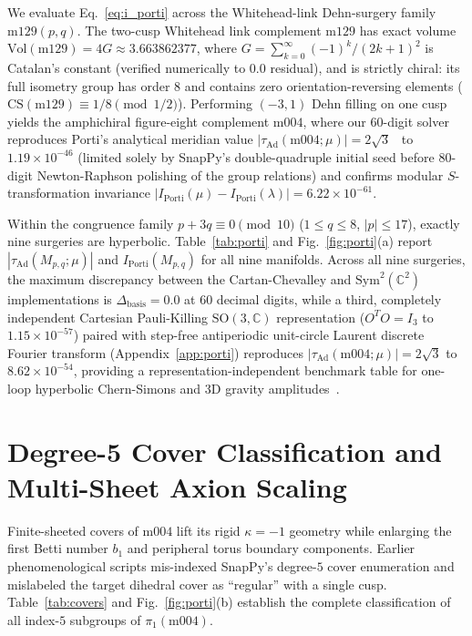 \documentclass[aps,prd,twocolumn,nofootinbib,floatfix]{revtex4-2}
\begin{document}
We evaluate Eq.~\eqref{eq:i_porti} across the Whitehead-link Dehn-surgery family $\mathrm{m129}(p,q)$.
The two-cusp Whitehead link complement $\mathrm{m129}$ has exact volume $\mathrm{Vol}(\mathrm{m129}) = 4G \approx 3.663862377$, where $G = \sum_{k=0}^\infty (-1)^k/(2k+1)^2$ is Catalan's constant (verified numerically to $0.0$ residual), and is strictly chiral: its full isometry group has order $8$ and contains zero orientation-reversing elements ($\mathrm{CS}(\mathrm{m129}) \equiv 1/8 \pmod{1/2}$).
Performing $(-3,1)$ Dehn filling on one cusp yields the amphichiral figure-eight complement $\mathrm{m004}$, where our $60$-digit solver reproduces Porti's analytical meridian value $|\tau_{\mathrm{Ad}}(\mathrm{m004};\mu)| = 2\sqrt{3}$~\cite{Porti1997} to $1.19\times 10^{-46}$ (limited solely by SnapPy's double-quadruple initial seed before $80$-digit Newton-Raphson polishing of the group relations) and confirms modular $S$-transformation invariance $|I_{\mathrm{Porti}}(\mu) - I_{\mathrm{Porti}}(\lambda)| = 6.22\times 10^{-61}$.

Within the congruence family $p + 3q \equiv 0 \pmod{10}$ ($1 \le q \le 8$, $|p| \le 17$), exactly nine surgeries are hyperbolic.
Table~\ref{tab:porti} and Fig.~\ref{fig:porti}(a) report $|\tau_{\mathrm{Ad}}(M_{p,q};\mu)|$ and $I_{\mathrm{Porti}}(M_{p,q})$ for all nine manifolds.
Across all nine surgeries, the maximum discrepancy between the Cartan-Chevalley and $\mathrm{Sym}^2(\mathbb{C}^2)$ implementations is $\Delta_{\mathrm{basis}} = 0.0$ at $60$ decimal digits, while a third, completely independent Cartesian Pauli-Killing $\mathrm{SO}(3,\mathbb{C})$ representation ($O^T O = I_3$ to $1.15\times 10^{-57}$) paired with step-free antiperiodic unit-circle Laurent discrete Fourier transform (Appendix~\ref{app:porti}) reproduces $|\tau_{\mathrm{Ad}}(\mathrm{m004};\mu)| = 2\sqrt{3}$ to $8.62\times 10^{-54}$, providing a representation-independent benchmark table for one-loop hyperbolic Chern-Simons and 3D gravity amplitudes~\cite{GiombiMaloneyYin2008}.

\section{Degree-5 Cover Classification and Multi-Sheet Axion Scaling}
\label{sec:covers}

Finite-sheeted covers of $\mathrm{m004}$ lift its rigid $\kappa = -1$ geometry while enlarging the first Betti number $b_1$ and peripheral torus boundary components.
Earlier phenomenological scripts mis-indexed SnapPy's degree-$5$ cover enumeration and mislabeled the target dihedral cover as ``regular'' with a single cusp.
Table~\ref{tab:covers} and Fig.~\ref{fig:porti}(b) establish the complete classification of all index-$5$ subgroups of $\pi_1(\mathrm{m004})$.
\end{document}
